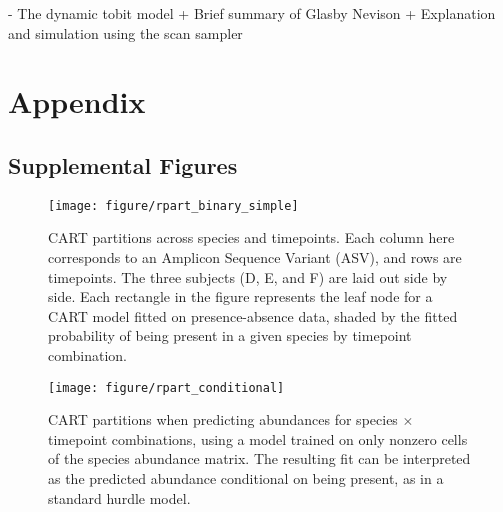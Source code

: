 \documentclass{article}
\begin{document}
- The dynamic tobit model
  + Brief summary of Glasby Nevison
  + Explanation and simulation using the scan sampler




\section{Appendix}
\label{sec:appendix}

\subsection{Supplemental Figures}
\label{subsec:supplemental_figures}

\begin{figure}[ht]
  \centering
  \caption{\label{fig:rpart_simple} }
\end{figure}

\begin{figure}[ht]
  \centering
  \caption{\label{fig:label} }
\end{figure}

\begin{figure}[ht]
  \centering
  \caption{\label{fig:rpart_complex_3} }
\end{figure}

\begin{figure}[ht]
  \centering
  \texttt{[image: figure/rpart\_binary\_simple]}
  \caption{CART partitions across species and timepoints. Each column here
    corresponds to an Amplicon Sequence Variant (ASV), and rows are timepoints.
    The three subjects (D, E, and F) are laid out side by side. Each rectangle
    in the figure represents the leaf node for a CART model fitted on
    presence-absence data, shaded by the fitted probability of being present in
    a given species by timepoint combination.
    \label{fig:rpart_binary_simple}}
\end{figure}

\begin{figure}[ht]
  \centering
  \texttt{[image: figure/rpart\_conditional]}
  \caption{CART partitions when predicting abundances for species $\times$
    timepoint combinations, using a model trained on only nonzero cells of the
    species abundance matrix. The resulting fit can be interpreted as the
    predicted abundance conditional on being present, as in a standard hurdle
    model. \label{fig:rpart_conditional} }
\end{figure}
\end{document}
